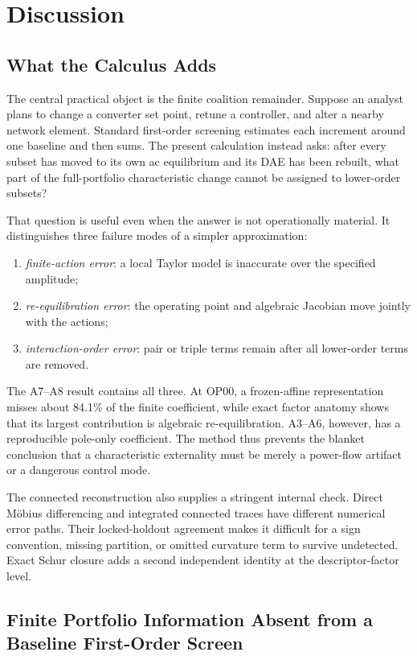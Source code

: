 \section{Discussion}
\subsection{What the Calculus Adds}

The central practical object is the finite coalition remainder. Suppose an
analyst plans to change a converter set point, retune a controller, and alter a
nearby network element. Standard first-order screening estimates each
increment around one baseline and then sums. The present calculation instead
asks: after every subset has moved to its own ac equilibrium and its DAE has
been rebuilt, what part of the full-portfolio characteristic change cannot be
assigned to lower-order subsets?

That question is useful even when the answer is not operationally material.
It distinguishes three failure modes of a simpler approximation:
\begin{enumerate}
    \item \emph{finite-action error}: a local Taylor model is inaccurate over
    the specified amplitude;
    \item \emph{re-equilibration error}: the operating point and algebraic
    Jacobian move jointly with the actions;
    \item \emph{interaction-order error}: pair or triple terms remain after
    all lower-order terms are removed.
\end{enumerate}
The A7--A8 result contains all three. At OP00, a frozen-affine representation
misses about 84.1\% of the finite coefficient, while exact factor anatomy
shows that its largest contribution is algebraic re-equilibration. A3--A6,
however, has a reproducible pole-only coefficient. The method thus prevents
the blanket conclusion that a characteristic externality must be merely a
power-flow artifact or a dangerous control mode.

The connected reconstruction also supplies a stringent internal check. Direct
M\"obius differencing and integrated connected traces have different numerical
error paths. Their locked-holdout agreement makes it difficult for a sign
convention, missing partition, or omitted curvature term to survive
undetected. Exact Schur closure adds a second independent identity at the
descriptor-factor level.

\subsection{Finite Portfolio Information Absent from a Baseline First-Order Screen}

